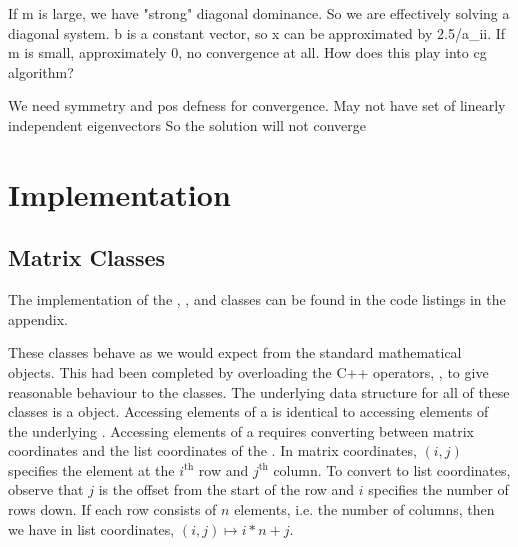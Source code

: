 If m is large, we have "strong" diagonal dominance. 
So we are effectively solving a diagonal system.
b is a constant vector, so x can be approximated by 2.5/a_{ii}.
If m is small, approximately 0, no convergence at all.
How does this play into cg algorithm?

We need symmetry and pos defness for convergence.
May not have set of linearly independent eigenvectors
So the solution will not converge


\fi

\section{Implementation}

\iffalse
Implementation discussion:

+Better band storage for wide bands with lots of zeros. Store the nonzeros with their locations.
-Better interaction with the program for inputting data or getting results. Use of a scripting language and parser. 
+Should treat vectors as matrices, reduces number of classes, fewer bugs and easier implementation.
+Sparse matrices
Unit tests
Error handling
\fi

\subsection{Matrix Classes}

The implementation of the , , and  classes can be found in the code listings in the appendix.

These classes behave as we would expect from the standard mathematical objects. 
This had been completed by overloading the C++ operators, \inline{+, -, *, /}, to give reasonable behaviour to the classes.
The underlying data structure for all of these classes is a  object.
Accessing elements of a  is identical to accessing elements of the underlying .
Accessing elements of a  requires converting between matrix coordinates and the list coordinates of the .
In matrix coordinates, $(i,j)$ specifies the element at the $i^\mathrm{th}$ row and $j^\mathrm{th}$ column.
To convert to list coordinates, observe that $j$ is the offset from the start of the row and $i$ specifies the number of rows down.
If each row consists of $n$ elements, i.e. the number of columns, then we have in list coordinates, $(i,j) \mapsto i*n + j$.



